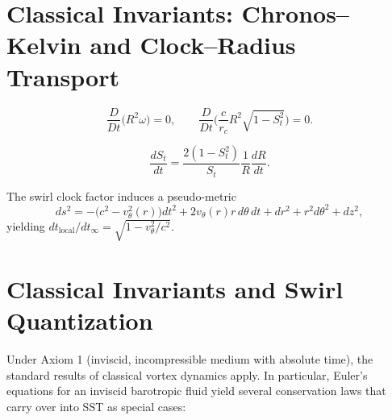 \documentclass[10pt,reprint,aps,onecolumn,nofootinbib]{revtex4-2}
\begin{document}




    \section{Classical Invariants: Chronos--Kelvin and Clock--Radius Transport}\label{canon58:classical-invariants}
    \begin{tcolorbox}[title=Axiom: Chronos--Kelvin Invariant]
    \label{canon58:CK}
    \[
        \frac{D}{Dt}\big(R^2\omega\big)=0,
        \qquad
        \frac{D}{Dt}\Big(\frac{c}{r_c}R^2\sqrt{1-S_t^2}\Big)=0.
    \]
    \end{tcolorbox}
    \begin{tcolorbox}[title=Corollary: Clock--Radius Transport]
    \label{canon58:clock-transport}
    \[
        \frac{dS_t}{dt} = \frac{2(1-S_t^2)}{S_t}\frac{1}{R}\frac{dR}{dt}.
    \]
    \end{tcolorbox}
    \begin{tcolorbox}[title=Remark (Pseudo-metric)]
    The swirl clock factor induces a pseudo-metric
    \[
        ds^2 = -\big(c^2 - v_\theta^2(r)\big)dt^2 + 2v_\theta(r)r\,d\theta\,dt + dr^2 + r^2 d\theta^2 + dz^2,
    \]
    yielding $dt_{\text{local}}/dt_\infty = \sqrt{1 - v_\theta^2/c^2}$. %
    \end{tcolorbox}


    \section{Classical Invariants and Swirl Quantization}
	Under Axiom 1 (inviscid, incompressible medium with absolute time), the standard results of classical vortex dynamics apply. In particular, Euler’s equations for an inviscid barotropic fluid yield several conservation laws that carry over into SST as special cases:
\end{document}
